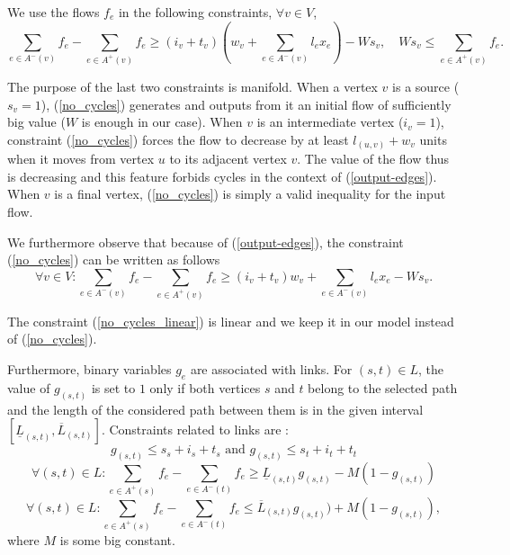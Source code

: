 \documentclass{endmH}
\newcommand{\forLaterVersions}[1]{}
\begin{document}
 We use the flows $f_e$ in the following constraints, $\forall v\in V$,
         \begin{equation}\label{no_cycles}
  \sum_{e\in A^{-}(v)} \!\!f_e  -  \!\!\sum_{e\in A^{+}(v)} \!\!f_e   \geq   (i_v + t_v) (w_v +   \!\!\sum_{e\in A^{-}(v)} \!\!l_e x_e) - W s_v, %
\quad
    W s_v \leq    \!\!\sum_{e\in A^{+}(v)} \!\!f_e. %
    \end{equation}

    
The purpose of the last  two constraints is manifold.  When a vertex $v$ is a source ($s_v=1$), (\ref{no_cycles}) \forLaterVersions{and (\ref{initial_flow})} generates and outputs from it an initial flow of sufficiently big value ($W$ is enough in our case). When $v$ is an intermediate vertex  ($i_v=1$), constraint (\ref{no_cycles}) forces the flow to decrease by at least $l_{(u,v)}+w_v$  units when it moves from vertex $u$ to its adjacent vertex $v$. The value of the flow thus is decreasing and this feature forbids cycles in the context of (\ref{output-edges}).  When $v$ is  a final vertex, (\ref{no_cycles}) is simply a valid inequality for the input flow.%
  
    
We furthermore observe that because of (\ref{output-edges}), the constraint   (\ref{no_cycles}) can be written as follows 
             \begin{equation}\label{no_cycles_linear}
      \forall v\in V:\sum_{e\in A^{-}(v)} f_e  -  \sum_{e\in A^{+}(v)} f_e   \geq    (i_v+t_v) w_v +   \sum_{e\in A^{-}(v)} l_e x_e - W s_v. %
             \end{equation}
             
The constraint  (\ref{no_cycles_linear}) is  linear and we keep it in our model instead of  (\ref{no_cycles}).       


Furthermore, binary variables $g_e$ are associated with links. For $(s,t) \in L$, the value of $g_{(s,t)}$ is set to  $1$ only if  both vertices $s$ and $t$ belong to the selected path and the length of the considered path between them is in the given interval  $[\underline{L}_{(s,t)},\overline{L}_{(s,t)}]$. Constraints related to links are :
%
 \begin{equation}\label{gst_left}
 g_{(s,t)} \leq s_s+i_s+t_s \mbox{ and }  g_{(s,t)} \leq s_t+i_t+t_t
       \end{equation}
  \begin{equation}\label{lbound}
  \forall (s,t) \in L: 
  \sum_{e\in A^{+}(s)} f_e - \sum_{e\in A^{-}(t)} f_e  \geq   \underline{L}_{(s,t)} g_{(s,t)} - M (1-g_{(s,t)})
       \end{equation}
         \begin{equation}\label{upbound}
  \forall (s,t) \in L: 
 \sum_{e\in A^{+}(s)} f_e - \sum_{e\in A^{-}(t)} f_e  \leq   \overline{L}_{(s,t)} g_{(s,t)}) + M (1-g_{(s,t)}),
       \end{equation}
%       
where $M$ is some big constant.  
         
\end{document}
